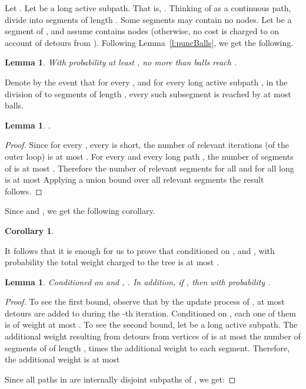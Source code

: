 \documentclass[twoside,leqno,twocolumn]{article}
\newtheorem{lemma}[theorem]{Lemma}
\newtheorem{corollary}[theorem]{Corollary}
\begin{document}
Let .
Let  be a long active subpath. That is, .
Thinking of  as a continuous path, divide  into  segments of length . Some segments may contain no nodes.
Let  be a segment of , and assume  contains nodes (otherwise, no cost is charged to  on account of detours from ). Following Lemma~\ref{l:puncBalls}, we get the following.
\begin{lemma}
With probability at least , no more than  balls reach .
\end{lemma}
Denote by  the event that for every , and for every long active subpath , in the division of  to segments of length , every such subsegment is reached by at most  balls.
\begin{lemma}
.
\end{lemma}
\begin{proof}
Since for every , every  is short, the number of relevant iterations (of the outer loop) is at most .
For every  and every long path , the number of segments of  is at most 
.
Therefore the number of relevant segments for all  and for all long  is at most 
Applying a union bound over all relevant segments the result follows.
\end{proof}
Since  and , we get the following corollary.
\begin{corollary}

\end{corollary}
It follows that it is enough for us to prove that conditioned on ,  and , with probability  the total weight charged to the tree is at most .
\begin{lemma} \label{l:long}
Conditioned on  and , . In addition, if , 
then  with probability .
\end{lemma}
\begin{proof}
To see the first bound, observe that by the update process of , at most  detours are added to  during the -th iteration. Conditioned on , each one of them is of weight at most .
To see the second bound, let  be a long active subpath.
The additional weight resulting from detours from vertices of  is at most the number of segments of  of length , times the additional weight to each segment. Therefore, the additional weight is at most 

Since all paths in  are internally disjoint subpaths of , we get:

\end{proof}
\end{document}
